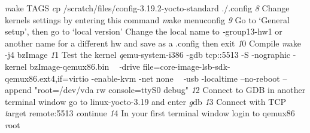 \documentclass{article}
\begin{document}
\textit make TAGS
\newline
\textit cp /scratch/files/config-3.19.2-yocto-standard ./.config
\newline
\newline
\textit 8 Change kernels settings by entering this command
\newline
\textit make menuconfig
\newline
\newline
\textit 9 Go to ‘General setup’, then go to ‘local version’ Change the local name to
\newline
\textit -group13-hw1 or another name for a different hw and save as a .config then exit
\newline
\textit 10 Compile
\newline
\textit make -j4 bzImage
\newline
\newline
\textit 11 Test the kernel
\newline
\textit qemu-system-i386 -gdb tcp::5513 -S -nographic -kernel bzImage-qemux86.bin \
\newline
\textit -drive file=core-image-lsb-sdk-qemux86.ext4,if=virtio -enable-kvm -net none \
\newline
\textit -usb -localtime --no-reboot --append "root=/dev/vda rw console=ttyS0 debug"
\newline
\newline
\textit 12 Connect to GDB in another terminal window go to linux-yocto-3.19 and enter
\newline
\textit gdb
\newline
\newline
\textit 13 Connect with TCP
\newline
\textit target remote:5513
\newline
\textit continue
\newline
\newline
\textit 14 In your first terminal window login to qemux86
\newline
\textit root
\newline

\end{document}
